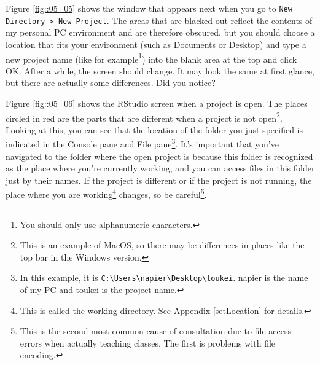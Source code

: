 \documentclass{ltjsbook}
\begin{document}
Figure \ref{fig::05_05} shows the window that appears next when you go to \verb|New Directory > New Project|. The areas that are blacked out reflect the contents of my personal PC environment and are therefore obscured, but you should choose a location that fits your environment (such as Documents or Desktop) and type a new project name (like  for example\footnote{You should only use alphanumeric characters.}) into the blank area at the top and click OK. After a while, the screen should change. It may look the same at first glance, but there are actually some differences. Did you notice?

Figure \ref{fig::05_06} shows the RStudio screen when a project is open. The places circled in red are the parts that are different when a project is not open\footnote{This is an example of MacOS, so there may be differences in places like the top bar in the Windows version.}. Looking at this, you can see that the location of the folder you just specified is indicated in the Console pane and File pane\footnote{In this example, it is \verb|C:\Users\napier\Desktop\toukei|. napier is the name of my PC and toukei is the project name.}. It's important that you've navigated to the folder where the open project is because this folder is recognized as the place where you're currently working, and you can access files in this folder just by their names. If the project is different or if the project is not running, the place where you are working\footnote{This is called the working directory. See Appendix \ref{setLocation} for details.} changes, so be careful\footnote{This is the second most common cause of consultation due to file access errors when actually teaching classes. The first is problems with file encoding.}.
\end{document}
